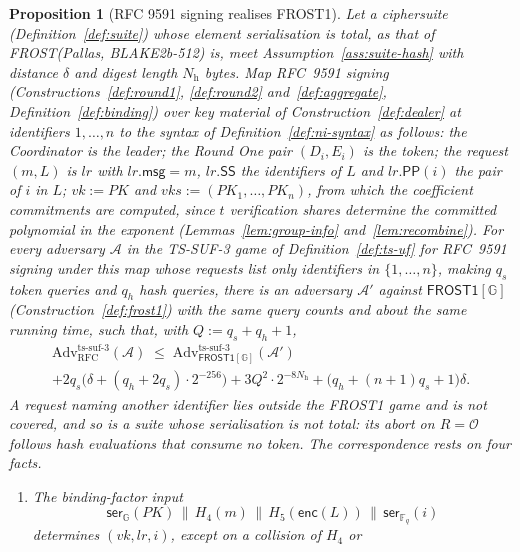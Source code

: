\documentclass[11pt,a4paper]{article}
\newtheorem{proposition}[theorem]{Proposition}
\theoremstyle{definition}
\newcommand{\F}{\mathbb{F}}
\newcommand{\G}{\mathbb{G}}
\newcommand{\Fq}{\F_q}
\newcommand{\Adv}{\mathcal{A}}
\begin{document}
\begin{proposition}[RFC 9591 signing realises FROST1]\label{prop:frost1}
Let a ciphersuite (Definition~\ref{def:suite}) whose element serialisation
is total, as that of FROST(Pallas, BLAKE2b-512) is, meet
Assumption~\ref{ass:suite-hash} with distance \(\delta\) and digest length
\(N_{\mathrm{h}}\) bytes. Map RFC~9591 signing
(Constructions~\ref{def:round1}, \ref{def:round2}
and~\ref{def:aggregate}, Definition~\ref{def:binding}) over key material of
Construction~\ref{def:dealer} at identifiers \(1, \dots, n\) to the syntax
of Definition~\ref{def:ni-syntax} as follows: the Coordinator is the leader;
the Round One pair \((D_i, E_i)\) is the token; the request \((m, L)\) is
\(\mathit{lr}\) with \(\mathit{lr}.\mathsf{msg} = m\),
\(\mathit{lr}.\mathsf{SS}\) the identifiers of \(L\) and
\(\mathit{lr}.\mathsf{PP}(i)\) the pair of \(i\) in \(L\);
\(\mathit{vk} := \mathit{PK}\) and
\(\mathit{vks} := (\mathit{PK}_1, \dots, \mathit{PK}_n)\), from which the
coefficient commitments are computed, since \(t\) verification shares
determine the committed polynomial in the exponent
(Lemmas~\ref{lem:group-info} and~\ref{lem:recombine}). For every adversary
\(\Adv\) in the TS-SUF-3 game of Definition~\ref{def:ts-uf} for RFC~9591
signing under this map whose requests list only identifiers in
\(\{1, \dots, n\}\), making \(q_s\) token queries and \(q_h\) hash
queries, there is an adversary \(\Adv'\) against \(\mathsf{FROST1}[\G]\)
(Construction~\ref{def:frost1}) with the same query counts and about the
same running time, such that, with \(Q := q_s + q_h + 1\),
\begin{multline*}
  \mathrm{Adv}^{\mathrm{ts\text{-}suf\text{-}3}}_{\mathrm{RFC}}(\Adv)
  \;\le\;
  \mathrm{Adv}^{\mathrm{ts\text{-}suf\text{-}3}}_{\mathsf{FROST1}[\G]}(\Adv')
  \\
  + 2 q_s \bigl(\delta + (q_h + 2 q_s) \cdot 2^{-256}\bigr)
  + 3 Q^{2} \cdot 2^{-8 N_{\mathrm{h}}}
  + \bigl(q_h + (n + 1) q_s + 1\bigr) \delta .
\end{multline*}
A request naming another identifier lies outside the FROST1 game and is not
covered, and so is a suite whose serialisation is not total: its abort on
\(R = \mathcal{O}\) follows hash evaluations that consume no token.
The correspondence rests on four facts.
\begin{enumerate}
\item[(a)] The binding-factor input
  \[
    \mathsf{ser}_{\G}(\mathit{PK}) \,\|\, H_4(m) \,\|\,
    H_5(\mathsf{enc}(L)) \,\|\, \mathsf{ser}_{\Fq}(i)
  \]
  determines
  \((\mathit{vk}, \mathit{lr}, i)\), except on a collision of \(H_4\) or

\end{enumerate}
\end{proposition}
\end{document}
